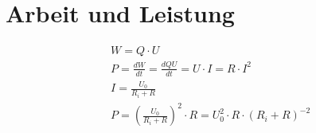 \section{Arbeit und Leistung}

\begin{align}
	& W = Q \cdot U \\
	& P = \frac{dW}{dt} = \frac{dQU}{dt} = U \cdot I = R \cdot I^2 \\
	& I = \frac{U_0}{R_i + R} \\
	& P = \left(\frac{U_0}{R_i + R}\right)^2 \cdot R = U_0^2 \cdot R \cdot (R_i + R)^{-2}
\end{align}
